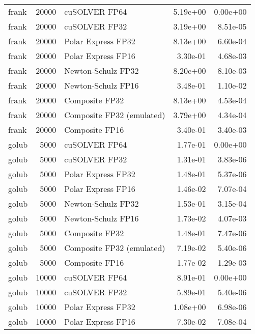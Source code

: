 \begin{table}
\begin{tabular}{lrlrr}
    frank & 20000 &             cuSOLVER FP64 &  5.19e+00 &        0.00e+00 \\
    frank & 20000 &             cuSOLVER FP32 &  3.19e+00 &        8.51e-05 \\
    frank & 20000 &        Polar Express FP32 &  8.13e+00 &        6.60e-04 \\
    frank & 20000 &        Polar Express FP16 &  3.30e-01 &        4.68e-03 \\
    frank & 20000 &        Newton-Schulz FP32 &  8.20e+00 &        8.10e-03 \\
    frank & 20000 &        Newton-Schulz FP16 &  3.48e-01 &        1.10e-02 \\
    frank & 20000 &            Composite FP32 &  8.13e+00 &        4.53e-04 \\
    frank & 20000 & Composite FP32 (emulated) &  3.79e+00 &        4.34e-04 \\
    frank & 20000 &            Composite FP16 &  3.40e-01 &        3.40e-03 \\
    golub &  5000 &             cuSOLVER FP64 &  1.77e-01 &        0.00e+00 \\
    golub &  5000 &             cuSOLVER FP32 &  1.31e-01 &        3.83e-06 \\
    golub &  5000 &        Polar Express FP32 &  1.48e-01 &        5.37e-06 \\
    golub &  5000 &        Polar Express FP16 &  1.46e-02 &        7.07e-04 \\
    golub &  5000 &        Newton-Schulz FP32 &  1.53e-01 &        3.15e-04 \\
    golub &  5000 &        Newton-Schulz FP16 &  1.73e-02 &        4.07e-03 \\
    golub &  5000 &            Composite FP32 &  1.48e-01 &        7.47e-06 \\
    golub &  5000 & Composite FP32 (emulated) &  7.19e-02 &        5.40e-06 \\
    golub &  5000 &            Composite FP16 &  1.77e-02 &        1.29e-03 \\
    golub & 10000 &             cuSOLVER FP64 &  8.91e-01 &        0.00e+00 \\
    golub & 10000 &             cuSOLVER FP32 &  5.89e-01 &        5.40e-06 \\
    golub & 10000 &        Polar Express FP32 &  1.08e+00 &        6.98e-06 \\
    golub & 10000 &        Polar Express FP16 &  7.30e-02 &        7.08e-04 \\

\end{tabular}
\end{table}
